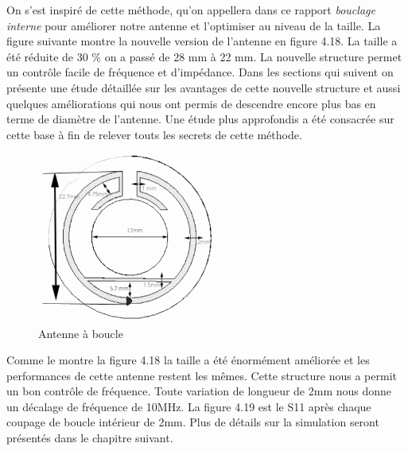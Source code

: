 \documentclass[11pt, a4paper, twoside]{book}
\begin{document}
On s'est inspiré de cette méthode, qu'on appellera dans ce rapport \emph{bouclage interne} pour améliorer notre antenne et l'optimiser au niveau de la taille. La figure suivante montre la nouvelle version de l'antenne en figure 4.18. La taille a été réduite de 30 \% on a passé de 28 mm à 22 mm. La nouvelle structure permet un contrôle facile de fréquence et d'impédance. Dans les sections qui suivent on présente une étude détaillée sur les avantages de cette nouvelle structure et aussi quelques améliorations qui nous ont permis de descendre encore plus bas en terme de diamètre de l'antenne. Une étude plus approfondis a été consacrée sur cette base à fin de relever touts les secrets de cette méthode.\\

\begin{figure}[H]
\centering
\includegraphics[width=6cm]{1STee}
\caption{Antenne à boucle}
\end{figure}
Comme le montre la figure 4.18 la taille a été énormément améliorée et les performances de cette antenne restent les mêmes. Cette structure nous a permit un bon contrôle de fréquence. Toute variation de longueur de 2mm nous donne un décalage de fréquence de 10MHz. La figure 4.19 est le S11 après chaque coupage de boucle intérieur de 2mm. Plus de détails sur la simulation seront présentés dans le chapitre suivant.\\
\end{document}
